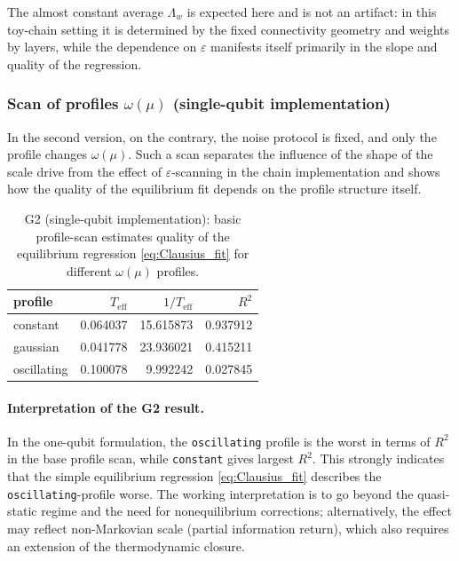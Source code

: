 \documentclass[11pt,a4paper]{article}
\theoremstyle{definition}
\theoremstyle{plain}
\theoremstyle{remark}
\begin{document}
The almost constant average $\Lambda_w$ is expected here and is not an artifact:
in this toy-chain setting it is determined by the fixed connectivity geometry and weights by layers,
while the dependence on $\varepsilon$ manifests itself primarily in the slope and quality of the regression.

\subsubsection[Scan of profiles omega(mu) (single-qubit implementation)]{Scan of profiles $\omega(\mu)$ (single-qubit implementation)}
\label{sec:numerics:G2profiles}

In the second version, on the contrary, the noise protocol is fixed, and only the profile changes $\omega(\mu)$.
Such a scan separates the influence of the shape of the scale drive from the effect of $\varepsilon$-scanning in the chain implementation
and shows how the quality of the equilibrium fit depends on the profile structure itself.

\begin{table}[t]
\centering
\caption{G2 (single-qubit implementation): basic profile-scan estimates
quality of the equilibrium regression \cref{eq:Clausius_fit} for different $\omega(\mu)$ profiles.}
\label{tab:G2profiles}
\begin{tabular}{@{}lrrr@{}}
\toprule
profile & $T_{\mathrm{eff}}$ & $1/T_{\mathrm{eff}}$ & $R^2$ \\
\midrule
constant    & 0.064037 & 15.615873 & 0.937912 \\
gaussian    & 0.041778 & 23.936021 & 0.415211 \\
oscillating & 0.100078 & 9.992242  & 0.027845 \\
\bottomrule
\end{tabular}
\end{table}

\paragraph{Interpretation of the G2 result.}
In the one-qubit formulation, the \texttt{oscillating} profile is the worst in terms of $R^2$ in the base profile scan,
while \texttt{constant} gives largest $R^2$.
This strongly indicates that the simple equilibrium regression \eqref{eq:Clausius_fit}
describes the \texttt{oscillating}-profile worse.
The working interpretation is to go beyond the quasi-static regime
and the need for nonequilibrium corrections; alternatively, the effect may reflect non-Markovian
scale (partial information return), which also requires an extension of the thermodynamic closure.
\end{document}

